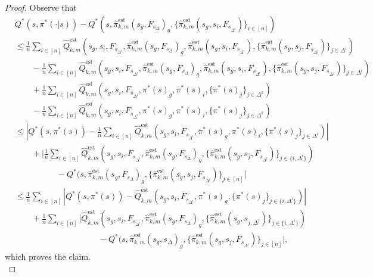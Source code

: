 \documentclass{article}
\theoremstyle{plain}
\theoremstyle{definition}
\def\est{\mathrm{est}}
\begin{document}
\begin{proof} Observe that
    \begin{align*}
    &Q^*(s,\pi^*(\cdot|s)) - Q^*(s,\hat{\pi}_{k,m}^\est(s_g,F_{s_\Delta})_g, \{\hat{\pi}_{k,m}^\est(s_g, s_{i},F_{s_{\Delta^i}})\}_{i\in[n]}) \\
    &\leq \frac{1}{n}\sum_{i\in[n]} \hat{Q}_{k,m}^\est(s_g, s_{i},F_{s_{\Delta^i}}, \hat{\pi}_{k,m}^\est(s_g,F_{s_\Delta})_g, \hat{\pi}_{k,m}^\est(s_g, s_{i},F_{s_{\Delta^i}}), \{\hat{\pi}_{k,m}^\est(s_g, s_{j},F_{s_{\Delta^j}})\}_{j\in \Delta^i}) \\
    &\quad\quad- \frac{1}{n}\sum_{i\in[n]} \hat{Q}_{k,m}^\est (s_g, s_{i},F_{s_{\Delta^i}}, \hat{\pi}_{k,m}^\est(s_g,F_{s_\Delta})_g, \hat{\pi}_{k,m}^\est(s_g, s_{i},F_{s_{\Delta^i}}), \{\hat{\pi}_{k,m}^\est(s_g, s_{j},F_{s_{\Delta^j}})\}_{j\in \Delta^i})\\
    &\quad\quad+ \frac{1}{n}\sum_{i\in[n]}\hat{Q}_{k,m}^\est(s_g, s_{i}, F_{s_{\Delta^i}}, \pi^*(s)_g, \pi^*(s)_i, \{\pi^*(s)_j\}_{j\in \Delta^k})\\
    &\quad\quad- \frac{1}{n}\sum_{i\in[n]}\hat{Q}_{k,m}^\est(s_g, s_{i}, F_{s_{\Delta^i}}, \pi^*(s)_g,\pi^*(s)_i, \{\pi^*(s)_j\}_{j\in \Delta^k})\\
    &\leq \left|Q^*(s, \pi^*(s)) - \frac{1}{n}\sum_{i\in[n]}\hat{Q}_{k,m}^\est(s_g, s_{i},F_{s_{\Delta^i}}, \pi^*(s)_g, \pi^*(s)_i, \{\pi^*(s)_j\}_{j\in\Delta^i})\right| \\
    &\quad\quad+ \bigg|\frac{1}{n}\sum_{i\in[n]}\hat{Q}_{k,m}^\est(s_g, s_{i},F_{s_{\Delta^i}}, \hat{\pi}_{k,m}^\est(s_g,F_{s_\Delta})_g, \{\hat{\pi}_{k,m}^\est(s_g, s_{j},F_{s_{\Delta^j}})\}_{j\in \{i,\Delta^i\}}) \\
    &\quad\quad\quad\quad\quad- Q^*(s, \hat{\pi}_{k,m}^\est(s_g,F_{s_\Delta})_g, \{\hat{\pi}_{k,m}^\est(s_g, s_{j},F_{s_{\Delta^j}})\}_{j\in[n]}\bigg|\\
    &\leq \frac{1}{n}\sum_{i\in[n]} \left|Q^*(s, \pi^*(s)) - \hat{Q}^\est_{k,m}(s_g, s_{i},F_{s_{\Delta^i}}, \pi^*(s)_g, \{\pi^*(s)_j\}_{j\in\{i,\Delta^i\}})\right|
    \end{align*}
    \begin{align*}
    &\quad\quad + \frac{1}{n}\sum_{i\in[n]} \bigg|\hat{Q}_{k,m}^\est(s_g, s_{i},F_{s_{\Delta^i}}, \hat{\pi}_{k,m}^\est(s_g,F_{s_\Delta})_g, \{\hat{\pi}_{k,m}^\est(s_g, s_{j,\Delta^j})\}_{j\in\{i,\Delta^i\}}) \\
    &\quad\quad\quad\quad\quad\quad\quad\quad\quad\quad - Q^*(s, \hat{\pi}_{k,m}^\est (s_g,s_\Delta)_g, \{\hat{\pi}_{k,m}^\est (s_g, s_{j},F_{s_{\Delta^j}})\}_{j\in[n]}\bigg|,
\end{align*}
which proves the claim.\qedhere\\
\end{proof}
\end{document}
